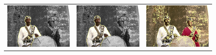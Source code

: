 \documentclass[runningheads]{llncs}
\begin{document}
\begin{figure}
\begin{tabular}{ccc}
		\includegraphics[scale=0.2]{images/segmentation/bc/man/gc-seg.png} &
		\includegraphics[scale=0.2]{images/segmentation/bc/man/corrected-seg.png} &
		\includegraphics[scale=0.2]{images/segmentation/schoenemann/man/man-seg.png}\\		

\end{tabular}
\end{figure}
\end{document}
